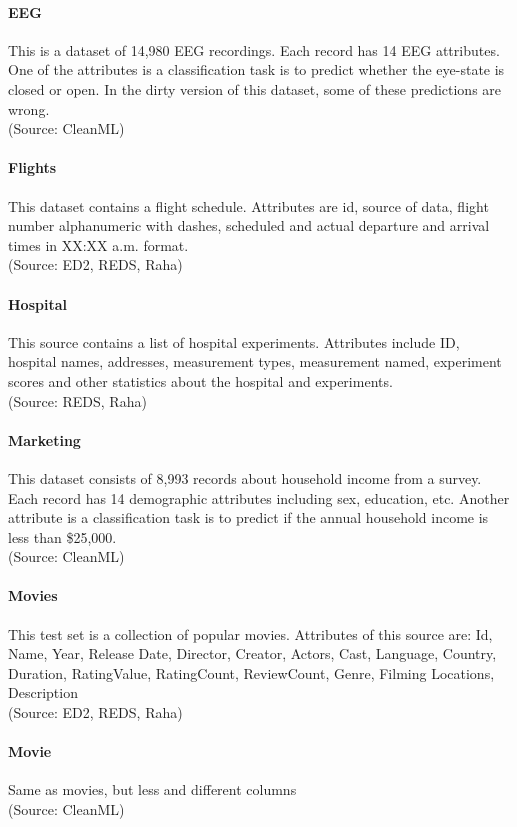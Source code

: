 \paragraph{EEG}
This is a dataset of 14,980 EEG recordings. Each record has 14 EEG attributes. One of the attributes is a classification task is to predict whether the eye-state is closed or open. In the dirty version of this dataset, some of these predictions are wrong.
\\(Source: CleanML)

\paragraph{Flights}
This dataset contains a flight schedule. Attributes are id, source of data, flight number alphanumeric with dashes, scheduled and actual departure and arrival times in XX:XX a.m. format.
\\(Source: ED2, REDS, Raha)

\paragraph{Hospital}
This source contains a list of hospital experiments. Attributes include ID, hospital names, addresses, measurement types, measurement named, experiment scores and other statistics about the hospital and experiments.
\\(Source: REDS, Raha)

\paragraph{Marketing}
This dataset consists of 8,993 records about household income from a survey. Each record has 14 demographic attributes including sex, education, etc. Another attribute is a classification task is to predict if the annual household income is less than \$25,000.
\\(Source: CleanML)

\paragraph{Movies}
This test set is a collection of popular movies. Attributes of this source are:
Id, Name, Year, Release Date, Director, Creator, Actors, Cast, Language, Country, Duration, RatingValue, RatingCount, ReviewCount, Genre, Filming Locations, Description
\\(Source: ED2, REDS, Raha)

\paragraph{Movie}
Same as movies, but less and different columns
\\(Source: CleanML)

